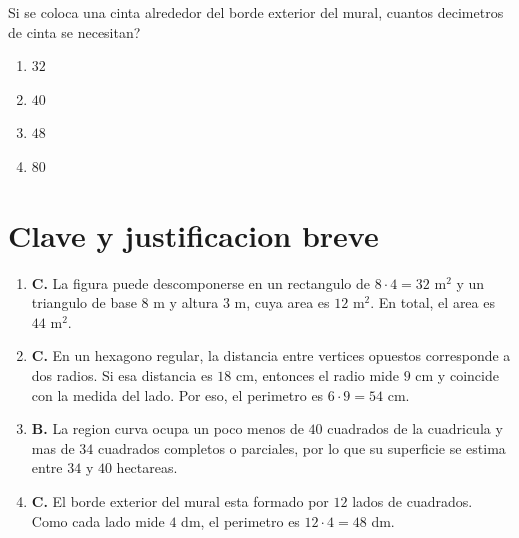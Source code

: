 \documentclass[12pt]{article}
\begin{document}
\begin{enumerate}[label=\textbf{\arabic*.}, itemsep=1.05cm]
\begin{center}
\end{center}

Si se coloca una cinta alrededor del borde exterior del mural, \textquestiondown cuantos decimetros de cinta se necesitan?

\begin{enumerate}[label=\Alph*)]
  \item $32$
  \item $40$
  \item $48$
  \item $80$
\end{enumerate}

\end{enumerate}

\section*{Clave y justificacion breve}

\begin{enumerate}[label=\textbf{\arabic*.}]
  \item \textbf{C.} La figura puede descomponerse en un rectangulo de $8\cdot 4=32$ m$^2$ y un triangulo de base $8$ m y altura $3$ m, cuya area es $12$ m$^2$. En total, el area es $44$ m$^2$.
  \item \textbf{C.} En un hexagono regular, la distancia entre vertices opuestos corresponde a dos radios. Si esa distancia es $18$ cm, entonces el radio mide $9$ cm y coincide con la medida del lado. Por eso, el perimetro es $6\cdot 9=54$ cm.
  \item \textbf{B.} La region curva ocupa un poco menos de $40$ cuadrados de la cuadricula y mas de $34$ cuadrados completos o parciales, por lo que su superficie se estima entre $34$ y $40$ hectareas.
  \item \textbf{C.} El borde exterior del mural esta formado por $12$ lados de cuadrados. Como cada lado mide $4$ dm, el perimetro es $12\cdot 4=48$ dm.
\end{enumerate}
\end{document}
